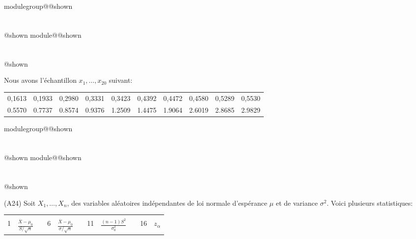 \documentclass{Evaluation}
\makeatletter
\newcommand{\currentmodulekey}{}
\newcommand{\currentmoduletitle}{}
\newcommand{\currentgroupkey}{}
\newcommand{\currentgrouptitle}{}
\newcommand{\showmoduleifneeded}{%
  \ifx\currentgroupkey\empty\else
    \expandafter\ifx\csname modulegroup@\currentgroupkey @shown\endcsname\relax
      \section*{\currentgrouptitle}%
      \expandafter\gdef\csname modulegroup@\currentgroupkey @shown\endcsname{1}%
    \fi
  \fi
  \expandafter\ifx\csname module@\currentmodulekey @shown\endcsname\relax
    \section*{\currentmoduletitle}%
    \expandafter\gdef\csname module@\currentmodulekey @shown\endcsname{1}%
  \fi
}
\newenvironment{H23}{\showmoduleifneeded}{}
\newenvironment{A24}{\showmoduleifneeded}{}
\makeatother
\begin{document}
\begin{questions}
\begin{H23}
Nous avons l'échantillon $x_1,\hdots,x_{20}$ suivant:

\begin{table}[ht]
\centering
\begin{tabular}{rrrrrrrrrr}
  \hline
0,1613 & 0,1933 & 0,2980 & 0,3331 & 0,3423 & 0,4392 & 0,4472 & 0,4580 & 0,5289 & 0,5530 \\ 
0.5570 & 0.7737 & 0.8574 & 0.9376 & 1.2509 & 1.4475 & 1.9064 & 2.6019 & 2.8685 & 2.9829 \\ 
   \hline
\end{tabular}
\end{table}

\end{H23}

\begin{A24}
\question
(A24) 
Soit $X_1,\hdots, X_{n}$, des variables aléatoires indépendantes de loi normale d'espérance $\mu$ et de variance $\sigma^2$. Voici plusieurs statistiques:
\begin{center}
    
\begin{tabular}{|c|c|c|c|c|c|c|c|c|c|c|}
\cline{1-2}\cline{4-5}\cline{7-8}\cline{10-11}&&&&&&&&&&\\[-3mm]

1 
& $\displaystyle \frac{\overline{X}-\mu_0}{S/\sqrt{n}}$
&
& 6 
& $\displaystyle \frac{\overline{X}-\mu_0}{\sigma/\sqrt{n}}$
&
&11
& $\displaystyle \frac{ (n-1)S^2}{ \sigma_0^2}$
&
&16
& $z_{\alpha}$
\\[4mm]


\end{tabular}
\end{center}
\end{A24}
\end{questions}
\end{document}
